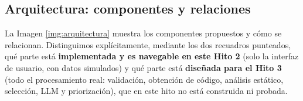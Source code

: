 \subsection{Arquitectura: componentes y relaciones}

La Imagen \ref{img:arquitectura} muestra los componentes propuestos y cómo se relacionan. Distinguimos explícitamente, mediante los dos recuadros punteados, qué parte está \textbf{implementada y es navegable en este Hito 2} (solo la interfaz de usuario, con datos simulados) y qué parte está \textbf{diseñada para el Hito 3} (todo el procesamiento real: validación, obtención de código, análisis estático, selección, LLM y priorización), que en este hito no está construida ni probada.


